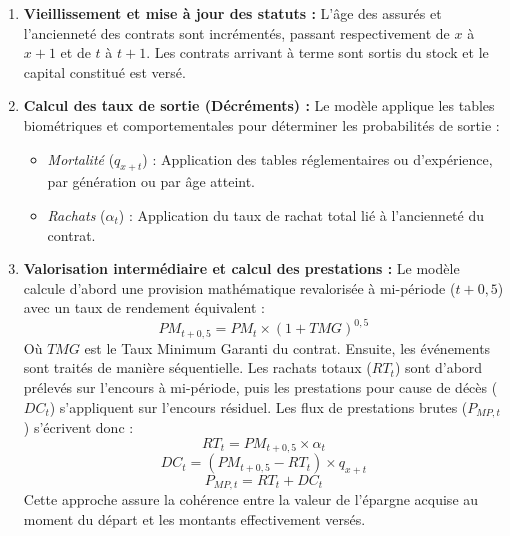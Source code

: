 \begin{enumerate}
    \item \textbf{Vieillissement et mise à jour des statuts :}
    L'âge des assurés et l'ancienneté des contrats sont incrémentés, passant respectivement de $x$ à $x+1$ et de $t$ à $t+1$. Les contrats arrivant à terme sont sortis du stock et le capital constitué est versé.

    \item \textbf{Calcul des taux de sortie (Décréments) :}
    Le modèle applique les tables biométriques et comportementales pour déterminer les probabilités de sortie :
    \begin{itemize}
        \item \textit{Mortalité} ($q_{x+t}$) : Application des tables réglementaires ou d'expérience, par génération ou par âge atteint.
        \item \textit{Rachats} ($\alpha_t$) : Application du taux de rachat total lié à l'ancienneté du contrat.
    \end{itemize}

    \item \textbf{Valorisation intermédiaire et calcul des prestations :}
    Le modèle calcule d'abord une provision mathématique revalorisée à mi-période ($t+0{,}5$) avec un taux de rendement équivalent :
    \begin{equation}
        PM_{t+0{,}5} = PM_{t} \times (1 + TMG)^{0{,}5}
    \end{equation}
    Où $TMG$ est le Taux Minimum Garanti du contrat. Ensuite, les événements sont traités de manière séquentielle. Les rachats totaux ($RT_t$) sont d'abord prélevés sur l'encours à mi-période, puis les prestations pour cause de décès ($DC_t$) s'appliquent sur l'encours résiduel. Les flux de prestations brutes ($P_{MP,t}$) s'écrivent donc :
    \begin{equation}
        RT_t = PM_{t+0{,}5} \times \alpha_t
    \end{equation}
    \begin{equation}
        DC_t = (PM_{t+0{,}5} - RT_t) \times q_{x+t}
    \end{equation}
    \begin{equation}
        P_{MP,t} = RT_t + DC_t
    \end{equation}
    Cette approche assure la cohérence entre la valeur de l'épargne acquise au moment du départ et les montants effectivement versés.


\end{enumerate}
